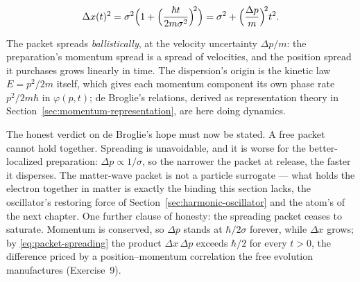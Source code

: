 \begin{linenomath}
    \begin{equation}
        \Delta x(t)^2 = \sigma^2\Bigl(1 + \Bigl(\frac{\hbar t}{2m\sigma^2}\Bigr)^{\!2}\Bigr) = \sigma^2 + \Bigl(\frac{\Delta p}{m}\Bigr)^{\!2} t^2 .
        \label{eq:packet-spreading}
    \end{equation}
\end{linenomath}
The packet spreads \emph{ballistically}, at the velocity uncertainty $\Delta p/m$: the preparation's momentum spread is a spread of velocities, and the position spread it purchases grows linearly in time. The dispersion's origin is the kinetic law $E = p^2/2m$ itself, which gives each momentum component its own phase rate $p^2/2m\hbar$ in $\varphi(p, t)$; de Broglie's relations, derived as representation theory in Section~\ref{sec:momentum-representation}, are here doing dynamics.

The honest verdict on de Broglie's hope must now be stated. A free packet cannot hold together. Spreading is unavoidable, and it is worse for the better-localized preparation: $\Delta p \propto 1/\sigma$, so the narrower the packet at release, the faster it disperses. The matter-wave packet is not a particle surrogate --- what holds the electron together in matter is exactly the binding this section lacks, the oscillator's restoring force of Section~\ref{sec:harmonic-oscillator} and the atom's of the next chapter. One further clause of honesty: the spreading packet ceases to saturate. Momentum is conserved, so $\Delta p$ stands at $\hbar/2\sigma$ forever, while $\Delta x$ grows; by \eqref{eq:packet-spreading} the product $\Delta x\,\Delta p$ exceeds $\hbar/2$ for every $t > 0$, the difference priced by a position--momentum correlation the free evolution manufactures (Exercise~9).

